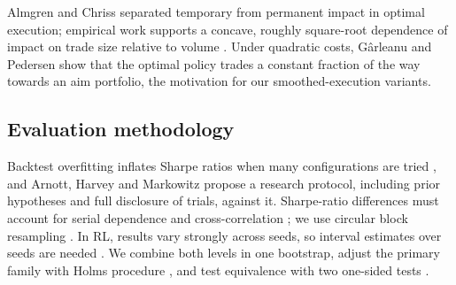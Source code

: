 \documentclass[11pt]{article}
\begin{document}
Almgren and Chriss \cite{r25} separated temporary from permanent impact in optimal execution; empirical work supports a concave, roughly square-root dependence of impact on trade size relative to volume \cite{r26,r27}. Under quadratic costs, Gârleanu and Pedersen \cite{r46} show that the optimal policy trades a constant fraction of the way towards an aim portfolio, the motivation for our smoothed-execution variants.

\subsection{Evaluation methodology}\label{evaluation-methodology}

Backtest overfitting inflates Sharpe ratios when many configurations are tried \cite{r33}, and Arnott, Harvey and Markowitz \cite{r55} propose a research protocol, including prior hypotheses and full disclosure of trials, against it. Sharpe-ratio differences must account for serial dependence and cross-correlation \cite{r30}; we use circular block resampling \cite{r29}. In RL, results vary strongly across seeds, so interval estimates over seeds are needed \cite{r31,r32}. We combine both levels in one bootstrap, adjust the primary family with Holm\textquotesingle s procedure \cite{r56}, and test equivalence with two one-sided tests \cite{r57}.
\end{document}
